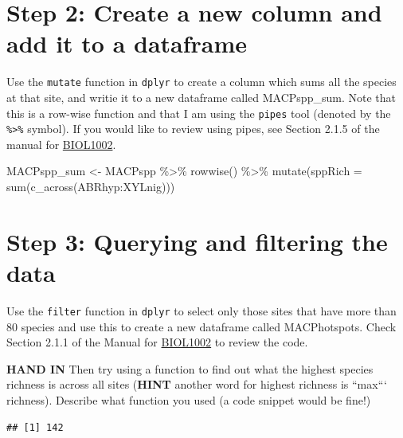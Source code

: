 \documentclass[
]{book}
\newenvironment{Shaded}{\begin{snugshade}}{\end{snugshade}}
\newcommand{\AttributeTok}[1]{\textcolor[rgb]{0.77,0.63,0.00}{#1}}
\newcommand{\FunctionTok}[1]{\textcolor[rgb]{0.00,0.00,0.00}{#1}}
\newcommand{\NormalTok}[1]{#1}
\newcommand{\OtherTok}[1]{\textcolor[rgb]{0.56,0.35,0.01}{#1}}
\newcommand{\SpecialCharTok}[1]{\textcolor[rgb]{0.00,0.00,0.00}{#1}}
\begin{document}
\hypertarget{step-2-create-a-new-column-and-add-it-to-a-dataframe}{%
\section{Step 2: Create a new column and add it to a dataframe}\label{step-2-create-a-new-column-and-add-it-to-a-dataframe}}

Use the \texttt{mutate} function in \texttt{dplyr} to create a column which sums all the species at that site, and writie it to a new dataframe called MACPspp\_sum. Note that this is a row-wise function and that I am using the \texttt{pipes} tool (denoted by the \texttt{\%\textgreater{}\%} symbol). If you would like to review using pipes, see Section 2.1.5 of the manual for \href{https://jakep962.github.io/Biol_1002/week1.html\#lab1}{BIOL1002}.

\begin{Shaded}
\begin{Highlighting}[]
\NormalTok{MACPspp\_sum }\OtherTok{\textless{}{-}}\NormalTok{ MACPspp }\SpecialCharTok{\%\textgreater{}\%}
  \FunctionTok{rowwise}\NormalTok{() }\SpecialCharTok{\%\textgreater{}\%}
  \FunctionTok{mutate}\NormalTok{(}\AttributeTok{sppRich =} \FunctionTok{sum}\NormalTok{(}\FunctionTok{c\_across}\NormalTok{(ABRhyp}\SpecialCharTok{:}\NormalTok{XYLnig)))}
\end{Highlighting}
\end{Shaded}

\hypertarget{step-3-querying-and-filtering-the-data}{%
\section{Step 3: Querying and filtering the data}\label{step-3-querying-and-filtering-the-data}}

Use the \texttt{filter} function in \texttt{dplyr} to select only those sites that have more than 80 species and use this to create a new dataframe called MACPhotspots. Check Section 2.1.1 of the Manual for \href{https://jakep962.github.io/Biol_1002/week1.html\#lab1}{BIOL1002} to review the code.

\textbf{HAND IN} Then try using a function to find out what the highest species richness is across all sites (\textbf{HINT} another word for highest richness is ``max``` richness). Describe what function you used (a code snippet would be fine!)

\begin{verbatim}
## [1] 142
\end{verbatim}
\end{document}
